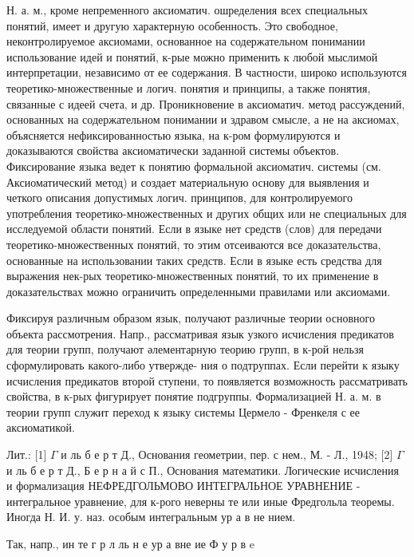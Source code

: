 \documentclass[10pt]{article}
\begin{document}
Н. а. м., кроме непременного аксиоматич. ошределения всех специальных понятий, имеет и другую характерную особенность. Это свободное, неконтролируемое аксиомами, основанное на содержательном понимании использование идей и понятий, к-рые можно применить к любой мыслимой интерпретации, независимо от ее содержания. В частности, широко используются теоретико-множественные и логич. понятия и принципы, а также понятия, связанные с идеей счета, и др. Проникновение в аксиоматич. метод рассуждений, основанных на содержательном понимании и здравом смысле, а не на аксиомах, объясняется нефиксированностью языка, на к-ром формулируются и доказываются свойства аксиоматически заданной системы объектов. Фиксирование языка ведет к понятию формальной аксиоматич. системы (см. Аксиоматический метод) и создает материальную основу для выявления и четкого описания допустимых логич. принципов, для контролируемого употребления теоретико-множественных и других общих или не специальных для исследуемой области понятий. Если в языке нет средств (слов) для передачи теоретико-множественных понятий, то этим отсеиваются все доказательства, основанные на использовании таких средств. Если в языке есть средства для выражения нек-рых теоретико-множественных понятий, то их применение в доказательствах можно ограничить определенными правилами или аксиомами.



Фиксируя различным образом язык, получают различные теории основного объекта рассмотрения. Напр., рассматривая язык узкого исчисления предикатов для теории групп, получают әлементарную теорию групп, в к-рой нельзя сформулировать какого-либо утвержде- ния о подтруппах. Если перейти к языку исчисления предикатов второй ступени, то появляется возможность рассматривать свойства, в к-рых фигурирует понятие подгруппы. Формализацией Н. а. м. в теории групп служит переход к языку системы Цермело - Френкеля с ее аксиоматикой.



Лит.: [1] $\Gamma$ и ль б е р т Д., Основания геометрии, пер. с нем., М. - Л., 1948; [2] $\Gamma$ и ль б е р т Д., Б е р н а й с П., Основания математики. Логические исчисления и формализация НЕФРЕДГОЛЬМОВО ИНТЕГРАЛЬНОЕ УРАВНЕНИЕ - интегральное уравнение, для к-рого неверны те или иные Фредгольла теоремы. Иногда Н. И. у. наз. особым интегральным ур а в не нием.



Так, напр., ин те г р л ль н е ур а вне ие Ф у р в e
\end{document}
